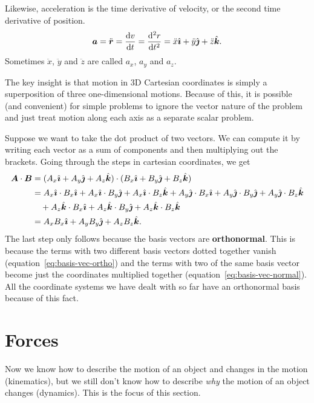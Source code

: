 \documentclass[../classical_mechanics.tex]{subfiles}
\begin{document}
            \begin{definition}
                Likewise, acceleration is the time derivative of velocity, or the second time derivative of position.
                \begin{equation}
                    \vec{a}=\ddot{\vec{r}}=\dv{v}{t}=\dv[2]{r}{t}=\ddot{x}\ihat+\ddot{y}\jhat+\ddot{z}\khat.
                \end{equation}
                Sometimes $\ddot{x}$, $\ddot{y}$ and $\ddot{z}$ are called $a_x$, $a_y$ and $a_z$.
            \end{definition}
            The key insight is that motion in 3D Cartesian coordinates is simply a superposition of three one-dimensional motions.
            Because of this, it is possible (and convenient) for simple problems to ignore the vector nature of the problem and just treat motion along each axis as a separate scalar problem.
            
            Suppose we want to take the dot product of two vectors.
            We can compute it by writing each vector as a sum of components and then multiplying out the brackets.
            Going through the steps in cartesian coordinates, we get
            \begin{align}
                \boldsymbol{A}\cdot\boldsymbol{B}&=(A_x\hat{\boldsymbol{\imath}}+A_y\hat{\boldsymbol{\jmath}}+A_z\hat{\boldsymbol{k}})\cdot(B_x\hat{\boldsymbol{\imath}}+B_y\hat{\boldsymbol{\jmath}}+B_z\hat{\boldsymbol{k}})\\
                &\begin{aligned}
                    &=A_x\hat{\boldsymbol{\imath}}\cdot B_x\hat{\boldsymbol{\imath}}+A_x\hat{\boldsymbol{\imath}}\cdot B_y\hat{\boldsymbol{\jmath}}+A_x\hat{\boldsymbol{\imath}}\cdot B_z\hat{\boldsymbol{k}}+A_y\hat{\boldsymbol{\jmath}}\cdot B_x\hat{\boldsymbol{\imath}}+A_y\hat{\boldsymbol{\jmath}}\cdot B_y\hat{\boldsymbol{\jmath}}+A_y\hat{\boldsymbol{\jmath}}\cdot B_z\hat{\boldsymbol{k}}\\
                    &\quad+A_z\hat{\boldsymbol{k}}\cdot B_x\hat{\boldsymbol{\imath}}+A_z\hat{\boldsymbol{k}}\cdot B_y\hat{\boldsymbol{\jmath}}+A_z\hat{\boldsymbol{k}}\cdot B_z\hat{\boldsymbol{k}}
                \end{aligned}\\
                &=A_xB_x\hat{\boldsymbol{\imath}}+A_yB_y\hat{\boldsymbol{\jmath}}+A_zB_z\hat{\boldsymbol{k}}.
            \end{align}
            The last step only follows because the basis vectors are \textbf{orthonormal}.
            This is because the terms with two different basis vectors dotted together vanish (equation~\ref{eq:basis-vec-ortho}) and the terms with two of the same basis vector become just the coordinates multiplied together (equation~\ref{eq:basis-vec-normal}).
            All the coordinate systems we have dealt with so far have an orthonormal basis because of this fact.

    \section{Forces}\label{sec:forces}
        Now we know how to describe the motion of an object and changes in the motion (kinematics), but we still don't know how to describe \textit{why} the motion of an object changes (dynamics).
        This is the focus of this section.
\end{document}
